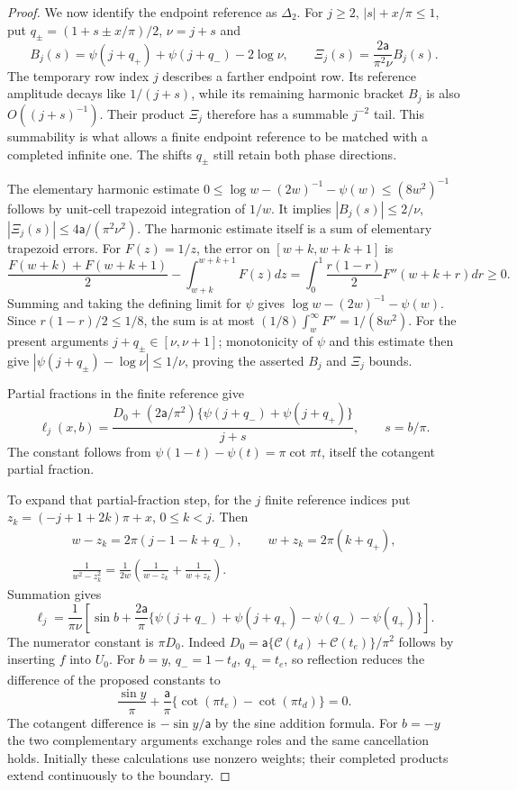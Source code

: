 \begin{proof}
We now identify the endpoint reference as $\Delta_2$. For $j\geq2$, $|s|+x/\pi\leq1$,
put $q_\pm=(1+s\pm x/\pi)/2$, $\nu=j+s$ and
\[
 B_j(s)=\psi(j+q_+)+\psi(j+q_-)-2\log\nu,\qquad
 \Xi_j(s)=\frac{2\mathsf{a}}{\pi^2\nu}B_j(s).
\]
The temporary row index $j$ describes a farther endpoint row. Its
reference amplitude decays like $1/(j+s)$, while its remaining harmonic
bracket $B_j$ is also $O((j+s)^{-1})$. Their product $\Xi_j$ therefore
has a summable $j^{-2}$ tail. This summability is what allows a finite
endpoint reference to be matched with a completed infinite one. The
shifts $q_\pm$ still retain both phase directions.

The elementary harmonic estimate
$0\leq\log w-(2w)^{-1}-\psi(w)\leq(8w^2)^{-1}$ follows by
unit-cell trapezoid integration of $1/w$. It implies
$|B_j(s)|\leq2/\nu$, $|\Xi_j(s)|\leq4\mathsf{a}/(\pi^2\nu^2)$.
The harmonic estimate itself is a sum of elementary trapezoid
errors. For $F(z)=1/z$, the error on $[w+k,w+k+1]$ is
\[
 \frac{F(w+k)+F(w+k+1)}2-\int_{w+k}^{w+k+1}F(z)dz
 =\int_0^1\frac{r(1-r)}2 F''(w+k+r)dr\geq0.
\]
Summing and taking the defining limit for $\psi$ gives
$\log w-(2w)^{-1}-\psi(w)$. Since $r(1-r)/2\leq1/8$,
the sum is at most $(1/8)\int_w^\infty F''=1/(8w^2)$.
For the present arguments $j+q_\pm\in[\nu,\nu+1]$;
monotonicity of $\psi$ and this estimate then give
$|\psi(j+q_\pm)-\log\nu|\leq1/\nu$, proving the asserted
$B_j$ and $\Xi_j$ bounds.

Partial fractions in the finite reference give
\[
 \ell_j(x,b)=\frac{D_0+(2\mathsf{a}/\pi^2)
                \{\psi(j+q_-)+\psi(j+q_+)\}}{j+s},\qquad s=b/\pi.
\]
The constant follows from
$\psi(1-t)-\psi(t)=\pi\cot\pi t$, itself the cotangent partial
fraction.

To expand that partial-fraction step, for the $j$ finite reference
indices put $z_k=(-j+1+2k)\pi+x$, $0\leq k<j$. Then
\[
 \begin{gathered}
 w-z_k=2\pi(j-1-k+q_-),\qquad w+z_k=2\pi(k+q_+),\\
 \frac1{w^2-z_k^2}=\frac1{2w}\left(\frac1{w-z_k}+\frac1{w+z_k}\right).
 \end{gathered}
\]
Summation gives
\[
 \ell_j=\frac1{\pi\nu}\left[\sin b+\frac{2\mathsf{a}}{\pi}
   \{\psi(j+q_-)+\psi(j+q_+)-\psi(q_-)-\psi(q_+)\}\right].
\]
The numerator constant is $\pi D_0$. Indeed
$D_0=\mathsf{a}\{\mathcal C(t_d)+\mathcal C(t_e)\}/\pi^2$ follows by
inserting $f$ into $U_0$. For $b=y$, $q_-=1-t_d$, $q_+=t_e$,
so reflection reduces the difference of the proposed constants to
\[
 \frac{\sin y}{\pi}+\frac {\mathsf{a}}{\pi}
              \{\cot(\pi t_e)-\cot(\pi t_d)\}=0.
\]
The cotangent difference is $-\sin y/\mathsf{a}$ by the sine addition formula.
For $b=-y$ the two complementary arguments exchange roles and the
same cancellation holds. Initially these calculations use nonzero
weights; their completed products extend continuously to the boundary.


\end{proof}
